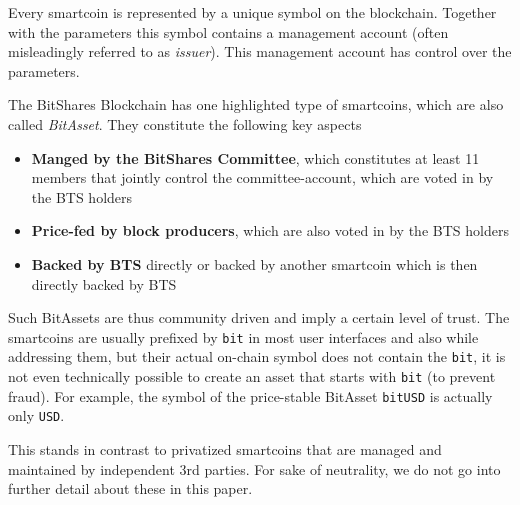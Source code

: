 Every smartcoin is represented by a unique symbol on the blockchain. Together
with the parameters this symbol contains a management account (often
misleadingly referred to as \emph{issuer}). This management account has control
over the parameters.

The BitShares Blockchain has one highlighted type of smartcoins, which are also
called \emph{BitAsset}. They constitute the following key aspects
\begin{itemize}
\item \textbf{Manged by the BitShares Committee}, which constitutes at least 11 
members that jointly control the committee-account, which are voted in by the BTS holders
\item \textbf{Price-fed by block producers}, which are also voted in by the BTS holders
\item \textbf{Backed by BTS} directly or backed by another smartcoin which is then directly backed by BTS
\end{itemize}
Such BitAssets are thus community driven and imply a certain level of trust. The
smartcoins are usually prefixed by \texttt{bit} in most user interfaces and also while addressing them,
but their actual on-chain symbol does not contain the \texttt{bit}, it is not even technically possible to create an asset that 
starts with \texttt{bit} (to prevent fraud). For example, the symbol of the price-stable BitAsset \texttt{bitUSD} is actually only \texttt{USD}.

This stands in contrast to privatized smartcoins that are managed and maintained by independent 3rd parties. For sake of neutrality, we do not go
into further detail about these in this paper.
